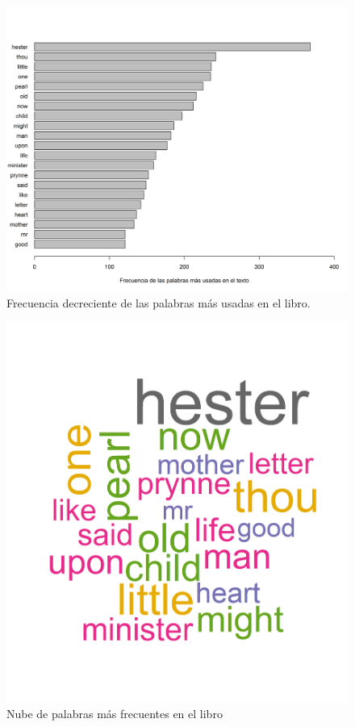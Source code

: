 \documentclass[fontsize=12pt]{article}
\begin{document}
\begin{figure}
\centering
\includegraphics[scale=0.6]{Figures/palabrasFiltradasDecr.png}
\caption{Frecuencia decreciente de las palabras más usadas en el libro.}
\label{palabrasfiltradasdec}
\end{figure}

\begin{figure}
\centering
\includegraphics[scale=0.8]{Figures/wordcloud.png}
\caption{Nube de palabras más frecuentes en el libro}
\label{worldcloud}
\end{figure}




\end{document}
